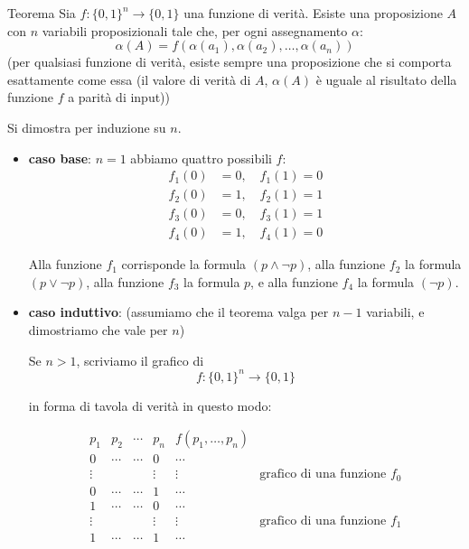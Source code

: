 \documentclass[a4paper,11pt]{report}
\begin{document}
\begin{thmframe}{Teorema}{}
    Sia \( f: \{0, 1\}^n \to \{0,1\} \) una funzione di verità. Esiste una proposizione \( A \) con \( n \) variabili proposizionali tale che, per ogni assegnamento \( \alpha \):
    \[ \alpha(A) = f(\alpha(a_1), \alpha(a_2), \dots, \alpha(a_n)) \]
    (per qualsiasi funzione di verità, esiste sempre una proposizione che si comporta esattamente come essa {\small\color{gray}(il valore di verità di \( A \), \( \alpha(A) \) è uguale al risultato della funzione \( f \) a parità di input)})
\end{thmframe}

\begin{proofframe}[title=dimostrazione]           
    Si dimostra per induzione su \( n \).

    \begin{itemize}
        \item \textbf{caso base}: \( n=1 \)
            abbiamo quattro possibili \( f \): 
            \[
                \begin{aligned}
                    f_1(0) &= 0, \quad f_1(1) = 0 \\
                    f_2(0) &= 1, \quad f_2(1) = 1 \\
                    f_3(0) &= 0, \quad f_3(1) = 1 \\
                    f_4(0) &= 1, \quad f_4(1) = 0
                \end{aligned}
            \]

            Alla funzione $f_1$ corrisponde la formula $(p \land \neg p)$, alla funzione $f_2$ la formula $(p \lor \neg p)$, 
            alla funzione $f_3$ la formula $p$, e alla funzione $f_4$ la formula $(\neg p)$.
        \item \textbf{caso induttivo}: (assumiamo che il teorema valga per \( n-1 \) variabili, e dimostriamo che vale per \( n \))

            Se $n > 1$, scriviamo il grafico di 
            \[
                f : \{0,1\}^n \to \{0,1\}
            \]

            in forma di tavola di verità in questo modo:

            \[
                \begin{array}{cccc|c|l}
                    p_1 & p_2 & \cdots & p_n & f(p_1, \ldots, p_n) & \\ \hline
                    0 & \cdots & \cdots & 0 & \cdots &  \\
                    \vdots & & & \vdots & \vdots & \text{grafico di una funzione } f_0\\
                    0 & \cdots & \cdots & 1 & \cdots & \\ \hline
                    1 & \cdots & \cdots & 0 & \cdots &  \\
                    \vdots & & & \vdots & \vdots & \text{grafico di una funzione } f_1\\
                    1 & \cdots & \cdots & 1 & \cdots & 
                \end{array}
            \]


\end{itemize}
\end{proofframe}
\end{document}

